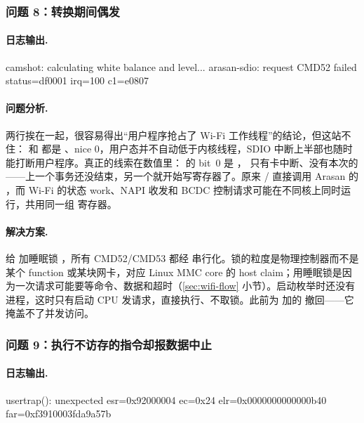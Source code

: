 \subsubsection{问题 8：转换期间偶发 }

\paragraph{日志输出.}
\begin{txtcode}
camshot: calculating white balance and level...
arasan-sdio: request CMD52 failed status=df0001 irq=100 c1=e0807
\end{txtcode}

\paragraph{问题分析.} 两行挨在一起，很容易得出“用户程序抢占了 Wi-Fi 工作线程”的结论，但这站不住： 和  都是 、nice 0，用户态并不自动低于内核线程，SDIO 中断上半部也随时能打断用户程序。真正的线索在数值里： 的 bit~0 是 ， 只有卡中断、没有本次的 ——上一个事务还没结束，另一个就开始写寄存器了。原来 / 直接调用 Arasan 的 ，而 Wi-Fi 的状态 work、NAPI 收发和 BCDC 控制请求可能在不同核上同时运行，共用同一组  寄存器。

\paragraph{解决方案.} 给  加睡眠锁 ，所有 CMD52/CMD53 都经  串行化。锁的粒度是物理控制器而不是某个 function 或某块网卡，对应 Linux MMC core 的 host claim；用睡眠锁是因为一次请求可能要等命令、数据和超时（\ref{sec:wifi-flow} 小节）。启动枚举时还没有进程，这时只有启动 CPU 发请求，直接执行、不取锁。此前为  加的  撤回——它掩盖不了并发访问。

\subsubsection{问题 9：执行不访存的指令却报数据中止}

\paragraph{日志输出.}
\begin{txtcode}
usertrap(): unexpected esr=0x92000004 ec=0x24
            elr=0x0000000000000b40 far=0xf3910003fda9a57b
\end{txtcode}

